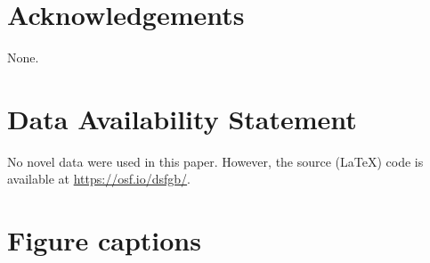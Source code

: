 \documentclass[utf8]{template/frontiersSCNS} %
\begin{document}
\section*{Acknowledgements}

None.



\section*{Data Availability Statement}

No novel data were used in this paper. However, the source (\LaTeX) code is available at \url{https://osf.io/dsfgb/}.


% 



\section*{Figure captions}

\end{document}
